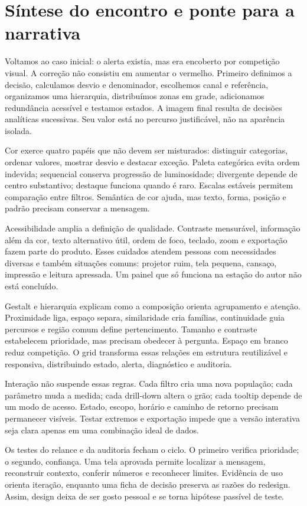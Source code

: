 \section{Síntese do encontro e ponte para a narrativa}

Voltamos ao caso inicial: o alerta existia, mas era encoberto por competição visual. A correção não consistiu em aumentar o vermelho. Primeiro definimos a decisão, calculamos desvio e denominador, escolhemos canal e referência, organizamos uma hierarquia, distribuímos zonas em grade, adicionamos redundância acessível e testamos estados. A imagem final resulta de decisões analíticas sucessivas. Seu valor está no percurso justificável, não na aparência isolada.

Cor exerce quatro papéis que não devem ser misturados: distinguir categorias, ordenar valores, mostrar desvio e destacar exceção. Paleta categórica evita ordem indevida; sequencial conserva progressão de luminosidade; divergente depende de centro substantivo; destaque funciona quando é raro. Escalas estáveis permitem comparação entre filtros. Semântica de cor ajuda, mas texto, forma, posição e padrão precisam conservar a mensagem.

Acessibilidade amplia a definição de qualidade. Contraste mensurável, informação além da cor, texto alternativo útil, ordem de foco, teclado, zoom e exportação fazem parte do produto. Esses cuidados atendem pessoas com necessidades diversas e também situações comuns: projetor ruim, tela pequena, cansaço, impressão e leitura apressada. Um painel que só funciona na estação do autor não está concluído.

Gestalt e hierarquia explicam como a composição orienta agrupamento e atenção. Proximidade liga, espaço separa, similaridade cria famílias, continuidade guia percursos e região comum define pertencimento. Tamanho e contraste estabelecem prioridade, mas precisam obedecer à pergunta. Espaço em branco reduz competição. O grid transforma essas relações em estrutura reutilizável e responsiva, distribuindo estado, alerta, diagnóstico e auditoria.

Interação não suspende essas regras. Cada filtro cria uma nova população; cada parâmetro muda a medida; cada drill-down altera o grão; cada tooltip depende de um modo de acesso. Estado, escopo, horário e caminho de retorno precisam permanecer visíveis. Testar extremos e exportação impede que a versão interativa seja clara apenas em uma combinação ideal de dados.

Os testes do relance e da auditoria fecham o ciclo. O primeiro verifica prioridade; o segundo, confiança. Uma tela aprovada permite localizar a mensagem, reconstruir contexto, conferir números e reconhecer limites. Evidência de uso orienta iteração, enquanto uma ficha de decisão preserva as razões do redesign. Assim, design deixa de ser gosto pessoal e se torna hipótese passível de teste.


